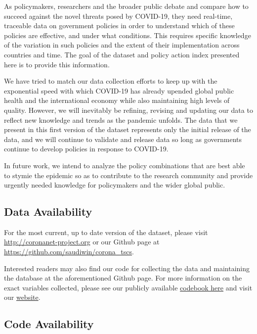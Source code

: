 \documentclass[]{article}
\begin{document}
As policymakers, researchers and the broader public debate and compare how to succeed against the novel threats posed by COVID-19, they need real-time, traceable data on government policies in order to understand which of these policies are effective, and under what conditions. This requires specific knowledge of the variation in such policies and the extent of their implementation across countries and time. The goal of the dataset and policy action index presented here is to provide this information.

We have tried to match our data collection efforts to keep up with the exponential speed with which COVID-19 has already upended global public health and the international economy while also maintaining high levels of quality. However, we will inevitably be refining, revising and updating our data to reflect new knowledge and trends as the pandemic unfolds. The data that we present in this first version of the dataset represents only the initial release of the data, and we will continue to validate and release data so long as governments continue to develop policies in response to COVID-19.

In future work, we intend to analyze the policy combinations that are best able to stymie the epidemic so as to contribute to the research community and provide urgently needed knowledge for policymakers and the wider global public.

\newpage

\hypertarget{data-availability}{%
\subsection*{Data Availability}\label{data-availability}}

For the most current, up to date version of the dataset, please visit \url{http://coronanet-project.org} or our Github page at \url{https://github.com/saudiwin/corona_tscs}.

Interested readers may also find our code for collecting the data and maintaining the database at the aforementioned Github page. For more information on the exact variables collected, please see our publicly available \href{https://docs.google.com/document/d/1zvNMpwj0onFvUZ_gLl4RRjqS-clbHv3TIX6EOHofsME/edit?usp=sharing}{codebook here} and visit our \href{https://coronanet-project.org/}{website}.

\hypertarget{code-availability}{%
\subsection*{Code Availability}\label{code-availability}}
\end{document}
